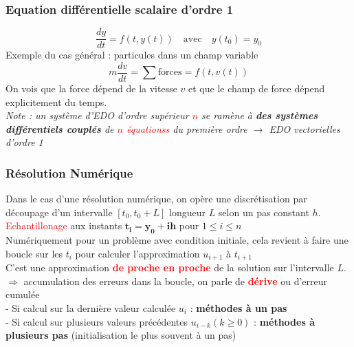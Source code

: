\documentclass{beamer}
\begin{document}
\begin{frame}
\frametitle{Equation différentielle scalaire d'ordre 1}
\begin{equation*}
\frac{dy}{dt} = f(t,y(t))\quad \text{avec} \quad y(t_0) = y_0
\end{equation*}
Exemple du cas général : particules dans un champ variable
\begin{equation*}
m\frac{dv}{dt} = \sum{\text{forces}} = f(t,v(t))
\end{equation*}
On vois que la force dépend de la vitesse $v$ et que le champ de force dépend explicitement du temps.\\
\vspace{1.2cm}
\textit{Note : un système d'EDO d'ordre supérieur \textcolor{red}{$n$} se ramène à \textbf{des systèmes différentiels couplés} de \textcolor{red}{$n$ équationss} du première ordre $\rightarrow$ EDO vectorielles d'ordre 1}
\end{frame}


\begin{frame}
\frametitle{Résolution Numérique}
Dans le cas d'une résolution numérique, on opère une discrétisation par découpage d'un intervalle $[t_0,t_0+L]$ longueur $L$ selon un pas constant $h$.\\
\vspace{0.3cm}
\textcolor{red}{Echantillonage} aux instants $\bm{ t_i = y_0 + ih}$ pour $ 1 \leqslant i \leqslant n$\\
\vspace{0.5cm}
Numériquement pour un problème avec condition initiale, cela revient à faire une boucle sur les $t_i$ pour calculer l'approximation $u_{i+1}$ à $t_{i+1}$\\
\vspace{0.1cm}
C'est une approximation \textbf{\textcolor{red}{de proche en proche}} de la solution sur l'intervalle $L$.\\
\vspace{0.2cm}
	$\Rightarrow$ accumulation des erreurs dans la boucle, on parle de \textbf{\textcolor{red}{dérive}} ou d'erreur cumulée\\
\vspace{0.6cm} 
- Si calcul sur la dernière valeur calculée $u_i$ : \textbf{méthodes à un pas}\\
- Si calcul sur plusieurs valeurs précédentes $u_{i-k}(k \geqslant 0)$ : \textbf{méthodes à plusieurs pas} \small{(initialisation le plus souvent à un pas)}

\end{frame}
\end{document}
